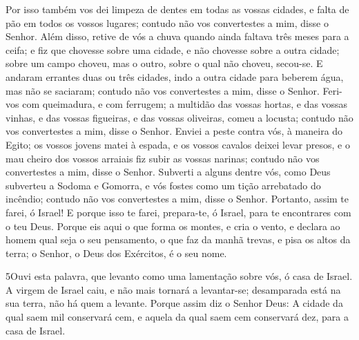 Por isso também vos dei limpeza de dentes em todas as vossas
cidades, e falta de pão em todos os vossos lugares; contudo não vos
convertestes a mim, disse o Senhor. Além disso, retive de vós a
chuva quando ainda faltava três meses para a ceifa; e fiz que
chovesse sobre uma cidade, e não chovesse sobre a outra cidade;
sobre um campo choveu, mas o outro, sobre o qual não choveu,
secou-se. E andaram errantes duas ou três cidades, indo a outra
cidade para beberem água, mas não se saciaram; contudo não vos
convertestes a mim, disse o Senhor. Feri-vos com queimadura, e
com ferrugem; a multidão das vossas hortas, e das vossas vinhas, e
das vossas figueiras, e das vossas oliveiras, comeu a locusta;
contudo não vos convertestes a mim, disse o Senhor. Enviei a
peste contra vós, à maneira do Egito; os vossos jovens matei à
espada, e os vossos cavalos deixei levar presos, e o mau cheiro dos
vossos arraiais fiz subir as vossas narinas; contudo não vos
convertestes a mim, disse o Senhor. Subverti a alguns dentre
vós, como Deus subverteu a Sodoma e Gomorra, e vós fostes como um
tição arrebatado do incêndio; contudo não vos convertestes a mim,
disse o Senhor. Portanto, assim te farei, ó Israel! E porque
isso te farei, prepara-te, ó Israel, para te encontrares com o teu
Deus. Porque eis aqui o que forma os montes, e cria o vento,
e declara ao homem qual seja o seu pensamento, o que faz da manhã
trevas, e pisa os altos da terra; o Senhor, o Deus dos Exércitos, é
o seu nome.

\medskip

\lettrine{5} Ouvi esta palavra, que levanto como uma
lamentação sobre vós, ó casa de Israel. A virgem de Israel caiu,
e não mais tornará a levantar-se; desamparada está na sua terra, não
há quem a levante. Porque assim diz o Senhor Deus: A cidade da
qual saem mil conservará cem, e aquela da qual saem cem conservará
dez, para a casa de Israel.

